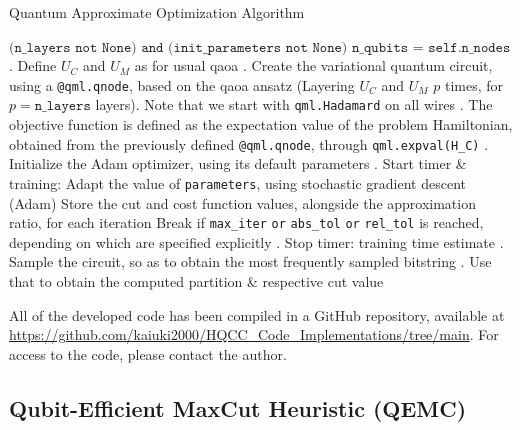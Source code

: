 \begin{algorithm}[H]
   \caption{Quantum Approximate Optimization Algorithm}\label{alg:QAOA}
   \begin{algorithmic}
   \Require $\texttt{(n\_layers not None) and (init\_parameters not None)}$
   \Ensure $\texttt{n\_qubits = self.n\_nodes}$
   . Define $U_C$ and $U_M$ as for usual \acrshort{qaoa}
   . Create the variational quantum circuit, using a \texttt{@qml.qnode}, based on the \acrshort{qaoa} ansatz (Layering $U_C$ and $U_M$ $p$ times, for $p = \texttt{n\_layers}$ layers). Note that we start with \texttt{qml.Hadamard} on all wires
   . The objective function is defined as the expectation value of the problem Hamiltonian, obtained from the previously defined \texttt{@qml.qnode}, through \texttt{qml.expval(H\_C)}
   . Initialize the Adam optimizer, using its default parameters
   . Start timer \& training:
    Adapt the value of \texttt{parameters}, using stochastic gradient descent (Adam)
    Store the cut and cost function values, alongside the approximation ratio, for each iteration
    Break if \texttt{max\_iter} \texttt{or} \texttt{abs\_tol} \texttt{or} \texttt{rel\_tol} is reached, depending on which are specified explicitly
   \EndWhile
   . Stop timer: training time estimate
   . Sample the circuit, so as to obtain the most frequently sampled bitstring
   . Use that to obtain the computed partition \& respective cut value
   \end{algorithmic}
\end{algorithm}

All of the developed code has been compiled in a GitHub repository, available at \url{https://github.com/kaiuki2000/HQCC_Code_Implementations/tree/main}. For access to the code, please contact the author.

\subsection{Qubit-Efficient MaxCut Heuristic (QEMC)}
\label{subsection:QEMC_Implementation}


